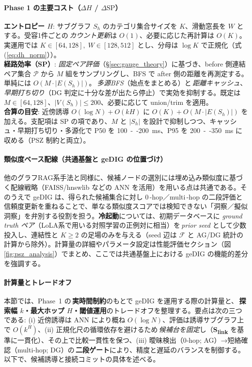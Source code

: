 \documentclass[ja=standard,xelatex]{bxjsarticle}
\newcommand{\F}{\mathcal{F}}
\begin{document}
\paragraph{Phase 1 の主要コスト（$\Delta H$ / $\Delta \mathrm{SP}$）}
\textbf{エントロピー $H$}: サブグラフ $S_h$ のカテゴリ集合サイズを $K$、滑動窓長を $W$ とする。受容1件ごとの\,\emph{カウント更新}は $O(1)$、必要に応じた再計算は $O(K)$。実運用では $K\in[64,128],\;W\in[128,512]$ とし、分母は $\log K$ で正規化（式\,(\ref{eq:dh_norm}））。
\\
\textbf{経路効率（SP）}: \emph{固定ペア評価}（\S\ref{sec:gauge_theory}）に基づき、before 側連結ペア集合 $\mathcal{P}$ から $M$ 組をサンプリングし、BFS で after 側の距離を再測定する。単純には $O(M\cdot |E(S_h)|)$。\,\emph{多源BFS}（始点をまとめる）と\,\emph{距離キャッシュ}、\,\emph{早期打ち切り}（DG 判定に十分な差が出たら停止）で実効を抑制する。既定は $M\in[64,128]$、$|V(S_h)|\le200$、必要に応じて union/trim を適用。
\\
\textbf{合算の目安}: 近傍誘導 $O(\log N)+O(kH)$ に $O(K)+O(M\cdot |E(S_h)|)$ を加える。支配項は SP の項であり、$M$ と $|S_h|$ を設計で抑制しつつ、キャッシュ・早期打ち切り・多源化で P50 を \SI{100}{--}\SI{200}{ms}、P95 を \SI{200}{--}\SI{350}{ms} に収める（PSZ 制約と両立）。

\paragraph{類似度ベース配線（共通基盤と geDIG の位置づけ）}
他のグラフRAG系手法\cite{graphrag2024,dygrag2024,kedkg2024}と同様に、候補ノードの選別には埋め込み類似度に基づく配線戦略（FAISS/hnswlib などの ANN を活用）を用いる点は共通である。そのうえで geDIG は、得られた候補集合に対し 0\,\mbox{-}hop／multi\,\mbox{-}hop の二段評価と信頼度更新を重ねることで、単なる類似度スコアでは検知できない「洞察／擬似洞察」を弁別する役割を担う。\textbf{冷起動}については、初期データベースに \emph{ground truth ペア}（LoLA系で用いる対照学習の正例対に相当）を\,\emph{prior seed} として少数投入し、連結性と $K\ge2$ の足場のみを与える（seed 辺は $\F$ と AG/DG 統計の計算から除外）。計算量の詳細やパラメータ設定は性能評価セクション（図\ref{fig:psz_analysis}）でまとめ、ここでは共通基盤上における geDIG の機能的差分を強調する。

\paragraph{計算量とトレードオフ}
本節では、Phase~1 の\,\textbf{実時間制約}のもとで geDIG を運用する際の計算量と、\,\textbf{探索幅 $k$・最大ホップ $H$・閾値運用}のトレードオフを整理する。要点は次の三つである: (i) 近傍誘導は ANN により概ね $O(\log N)$、評価は誘導サブグラフ上で $O(k^H)$、(ii) 正規化尺の循環依存を避けるため\,\emph{候補台を固定}し（\textbf{S\textsubscript{link}} を基準に一貫化）、その上で比較一貫性を保つ、(iii) 曖昧検出（0‑hop; AG）→短絡確認（multi‑hop; DG）の\,\textbf{二段ゲート}により、精度と遅延のバランスを制御する。以下で、候補誘導と接続コミットの具体を述べる。
\end{document}

